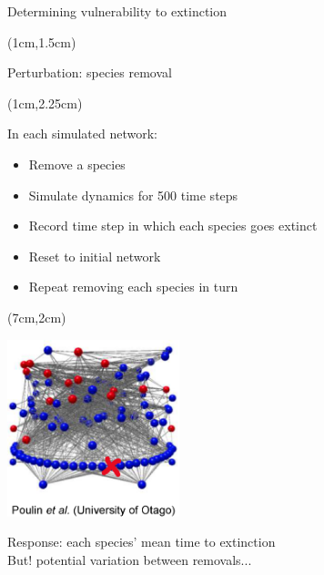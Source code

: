\documentclass{beamer}
\newcommand*\whitem{%
  \item[\color{white}\scalebox{0.9}{\textbullet}]}
\begin{document}
  \begin{frame}{Determining vulnerability to extinction}

    \begin{textblock*}{7cm}(1cm,1.5cm)

      {\color{DarkBlue}Perturbation: species removal}

    \end{textblock*}

    \begin{textblock*}{5cm}(1cm,2.25cm)

      {\color{DarkBlue}In each simulated network:}

      \begin{itemize}
        \item Remove a species
        \whitem {\color{white}Simulate dynamics for 500 time steps}
        \whitem {\color{white}Record time step in which each species goes extinct}
        \whitem {\color{white}Reset to initial network}
        \whitem {\color{white}Repeat removing each species in turn}

      \end{itemize}

      \end{textblock*}

    \begin{textblock*}{5cm}(7cm,2cm)

      \includegraphics[width=5cm]{intro_figs/Otagoweb_remove3.eps}

      \end{textblock*}

    {\color{white} Response: each species' mean time to extinction\\
    But! potential variation between removals...}

    \end{frame}
\end{document}
